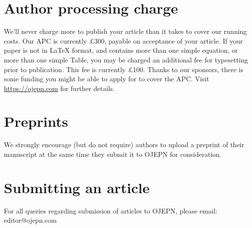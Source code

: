 \documentclass[twocolumn]{article}
\begin{document}
\section{Author processing charge}

We'll never charge more to publish your article than it takes to cover our running costs. Our APC is currently £300, payable on acceptance of your article. If your paper is not in LaTeX format, and contains more than one simple equation, or more than one simple Table, you may be charged an additional fee for typesetting prior to publication. This fee is currently £100. Thanks to our sponsors, there is some funding you might be able to apply for to cover the APC. Visit \url{https://ojepn.com} for further details.

\section{Preprints}

We strongly encourage (but do not require) authors to upload a preprint of their manuscript at the same time they submit it to OJEPN for consideration. 

\section{Submitting an article}

For all queries regarding submission of articles to OJEPN, please email: editor@ojepn.com
\end{document}
